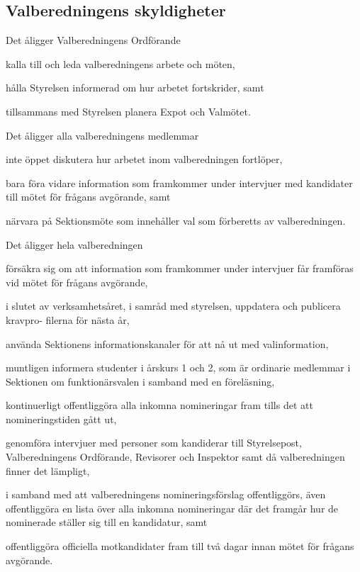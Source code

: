 \documentclass[10pt]{article}
\begin{document}
\subsection{Valberedningens skyldigheter}
Det åligger Valberedningens Ordförande
\begin{attlist}
    \item kalla till och leda valberedningens arbete och möten,
    \item hålla Styrelsen informerad om hur arbetet fortskrider, samt
    \item tillsammans med Styrelsen planera Expot och Valmötet.
\end{attlist}
Det åligger alla valberedningens medlemmar
\begin{attlist}
    \item inte öppet diskutera hur arbetet inom valberedningen fortlöper,
    \item bara föra vidare information som framkommer under intervjuer med kandidater till mötet för frågans avgörande, samt
    \item närvara på Sektionsmöte som innehåller val som förberetts av
        valberedningen.
\end{attlist}
Det åligger hela valberedningen
\begin{attlist}
    \item försäkra sig om att information som framkommer under intervjuer får framföras vid mötet för frågans avgörande,
    \item i slutet av verksamhetsåret, i samråd med styrelsen, uppdatera och publicera kravpro- filerna för nästa år,
    \item använda Sektionens informationskanaler för att nå ut med valinformation,
    \item muntligen informera studenter i årskurs 1 och 2, som är ordinarie medlemmar i Sektionen om funktionärsvalen i samband med
        en föreläsning,
    \item kontinuerligt offentliggöra alla inkomna nomineringar fram tills
        det att nomineringstiden gått ut,
    \item genomföra intervjuer med personer som kandiderar till Styrelsepost,
        Valberedningens Ordförande, Revisorer och
        Inspektor samt då valberedningen finner det lämpligt,
    \item i samband med att valberedningens nomineringsförslag offentliggörs,
        även offentliggöra en lista över alla inkomna nomineringar där det
        framgår hur de nominerade ställer sig till en kandidatur, samt
    \item offentliggöra officiella motkandidater fram till två dagar innan
        mötet för frågans avgörande.
\end{attlist}
\end{document}
